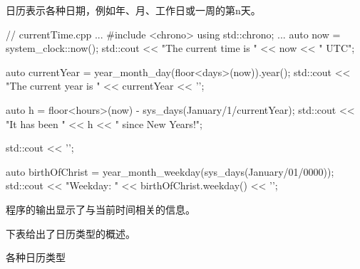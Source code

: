 
日历表示各种日期，例如年、月、工作日或一周的第n天。


\begin{cpp}
// currentTime.cpp
...
#include <chrono>
using std::chrono;
...
auto now = system_clock::now();
std::cout << "The current time is " << now << " UTC\n";

auto currentYear = year_month_day(floor<days>(now)).year();
std::cout << "The current year is " << currentYear << '\n';

auto h = floor<hours>(now) - sys_days(January/1/currentYear);
std::cout << "It has been " << h << " since New Years!\n";

std::cout << '\n';

auto birthOfChrist = year_month_weekday(sys_days(January/01/0000));
std::cout << "Weekday: " << birthOfChrist.weekday() << '\n';
\end{cpp}

程序的输出显示了与当前时间相关的信息。


下表给出了日历类型的概述。

\begin{center}
各种日历类型
\end{center}

